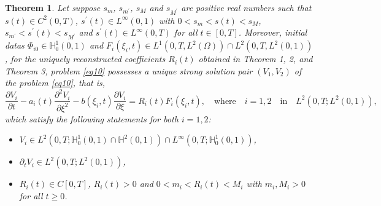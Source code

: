 \documentclass[preprint,12pt,authoryear]{elsarticle}
\newtheorem{theorem}{Theorem}
\begin{document}
\begin{theorem}\label{thm4}
Let suppose $s_m$, $s_{m^{\prime}}$, $s_M$ and $s_{M^{\prime}}$ are positive real numbers such that $s(t)\in C^2(0,T)$, $s^{\prime}(t)\in L^{\infty}(0,1)$ with $0<s_m<s(t)<s_M$, $s_{m^{\prime}}<s^{\prime}(t)<s_{M^{\prime}}$ and $s^{\prime}(t)\in L^{\infty}(0,T)$ for all $t\in[0,T]$. Moreover, initial datas $\Phi_{i0}\in \mathbb{H}_0^1(0,1)$ and $F_i(\xi_i,t)\in L^1(0,T,L^2(\Omega))\cap L^2(0,T,L^2(0,1))$, for the uniquely reconstructed coefficients $R_i(t)$ obtained in Theorem 1, 2, and Theorem 3, problem \eqref{eq10} possesses a unique strong solution pair $(V_1,V_2)$ of the problem \eqref{eq10}, that is,
$$\frac{\partial V_i}{\partial t}-a_i(t)\frac{\partial^2 V_i}{\partial \xi^2}-b(\xi_i,t)\frac{\partial V_i}{\partial \xi}=R_i(t)F_i(\xi_i,t),\quad\text{where}\quad i=1,2\quad\text{in}\quad L^2(0,T;L^2(0,1)),$$ which satisfy the following statements for both $i=1,2$:
\begin{itemize}
    \item[a)] $V_i\in L^2(0,T;\mathbb{H}_0^1(0,1)\cap \mathbb{H}^2(0,1))\cap L^{\infty}(0,T;\mathbb{H}_0^1(0,1))$,
    \item[b)] $\partial_t V_i\in L^2(0,T;L^2(0,1))$,
    \item[c)] $R_i(t)\in C[0,T]$, $R_i(t)>0$ and $0<m_i<R_i(t)< M_i$ with $m_i,M_i>0$ for all $t\geq 0$. 
\end{itemize}
\end{theorem}
\end{document}
